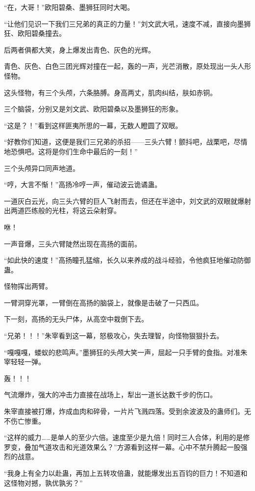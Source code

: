 
\begin{this_body}

“在，大哥！”欧阳碧桑、墨狮狂同时大喝。

“让他们见识一下我们三兄弟的真正的力量！”刘文武大吼，速度不减，直接向墨狮狂、欧阳碧桑撞去。

后两者俱都大笑，身上爆发出青色、灰色的光辉。

青色、灰色、白色三团光辉对撞在一起，轰的一声，光芒消散，原处现出一头人形怪物。

这头怪物，有三个头颅，六条胳膊。身高两丈，肌肉纠结，肤如赤铜。

三个脑袋，分别又是刘文武、欧阳碧桑以及墨狮狂的形象。

“这是？！”看到这样匪夷所思的一幕，无数人瞪圆了双眼。

“好教你们知道，这便是我们三兄弟的杀招——三头六臂！颤抖吧，战栗吧，尽情地恐惧吧。这将是你们生命中最后的一刻！”

三个头颅异口同声地道。

“哼，大言不惭！”高扬冷哼一声，催动波云诡谲蛊。

一道灰白云光，向三头六臂的巨人飞射而去，但还在半途中，刘文武的双眼就爆射出两道匹练般的光柱，将这云朵射穿。

咻！

一声音爆，三头六臂陡然出现在高扬的面前。

“如此快的速度！”高扬瞳孔猛缩，长久以来养成的战斗经验，令他疯狂地催动防御蛊。

怪物挥出两臂。

一臂洞穿光罩，一臂倒在高扬的脑袋上，就像是击破了一只西瓜。

下一刻，高扬的无头尸体，从高空中栽倒下去。

“兄弟！！！”朱宰看到这一幕，怒极攻心，失去理智，向怪物狠狠扑去。

“嘎嘎嘎，蝼蚁的悲鸣声。”墨狮狂的头颅大笑一声，屈起一只手臂的食指。对准朱宰轻轻一弹。

轰！！！

气流爆炸，强大的冲击力直接在战场上，犁出一道长达数千步的伤口。

朱宰直接被打爆，炸成血肉和碎骨，一片片飞溅四落。受到余波波及的蛊师们。无不伤亡惨重。

“这样的威力……是单人的至少六倍。速度至少是九倍！同时三人合体，利用的是修罗变，叠加气道攻击和光道效果么？”方源看到这样一幕。心中不禁升腾起一股强烈的战意。

“我身上有全力以赴蛊，再加上五转攻倍蛊，就能爆发出五百钧的巨力！不知道和这怪物对撼，孰优孰劣？”


\end{this_body}

